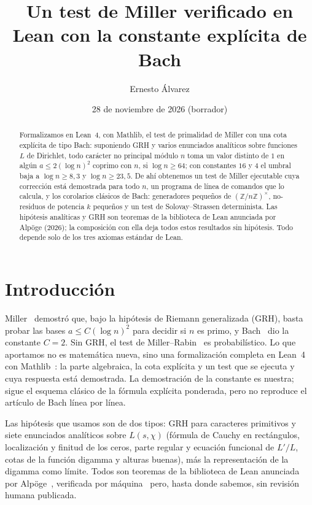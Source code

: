 \documentclass[11pt,a4paper]{amsart}
\title[Un test de Miller verificado con la constante de Bach]{Un test de Miller verificado en Lean con la constante expl\'icita de Bach}
\author{Ernesto \'Alvarez}
\date{28 de noviembre de 2026 (borrador)}
\theoremstyle{remark}
\newcommand{\Z}{\mathbb{Z}}
\begin{document}
\begin{abstract}
Formalizamos en Lean~4, con Mathlib, el test de primalidad de Miller con una cota expl\'icita de tipo Bach: suponiendo GRH y varios enunciados anal\'iticos sobre funciones $L$ de Dirichlet, todo car\'acter no principal m\'odulo $n$ toma un valor distinto de $1$ en alg\'un $a\le 2(\log n)^2$ coprimo con $n$, si $\log n\ge 64$; con constantes $16$ y $4$ el umbral baja a $\log n\ge 8{,}3$ y $\log n\ge 23{,}5$. De ah\'i obtenemos un test de Miller ejecutable cuya correcci\'on est\'a demostrada para todo $n$, un programa de l\'inea de comandos que lo calcula, y los corolarios cl\'asicos de Bach: generadores peque\~nos de $(\Z/n\Z)^\times$, no-residuos de potencia $k$ peque\~nos y un test de Solovay--Strassen determinista. Las hip\'otesis anal\'iticas y GRH son teoremas de la biblioteca de Lean anunciada por Alp\"oge (2026); la composici\'on con ella deja todos estos resultados sin hip\'otesis. Todo depende solo de los tres axiomas est\'andar de Lean.
\end{abstract}

\maketitle

\section{Introducci\'on}

Miller~\cite{Miller} demostr\'o que, bajo la hip\'otesis de Riemann generalizada (GRH), basta probar las bases $a\le C(\log n)^2$ para decidir si $n$ es primo, y Bach~\cite{Bach} dio la constante $C=2$. Sin GRH, el test de Miller--Rabin~\cite{Rabin} es probabil\'istico. Lo que aportamos no es matem\'atica nueva, sino una formalizaci\'on completa en Lean~4~\cite{Lean4} con Mathlib~\cite{Mathlib}: la parte algebraica, la cota expl\'icita y un test que se ejecuta y cuya respuesta est\'a demostrada. La demostraci\'on de la constante es nuestra; sigue el esquema cl\'asico de la f\'ormula expl\'icita ponderada, pero no reproduce el art\'iculo de Bach l\'inea por l\'inea.

Las hip\'otesis que usamos son de dos tipos: GRH para caracteres primitivos y siete enunciados anal\'iticos sobre $L(s,\chi)$ (f\'ormula de Cauchy en rect\'angulos, localizaci\'on y finitud de los ceros, parte regular y ecuaci\'on funcional de $L'/L$, cotas de la funci\'on digamma y alturas buenas), m\'as la representaci\'on de la digamma como l\'imite. Todos son teoremas de la biblioteca de Lean anunciada por Alp\"oge~\cite{Alpoge}, verificada por m\'aquina~\cite{MIT} pero, hasta donde sabemos, sin revisi\'on humana publicada.
\end{document}
